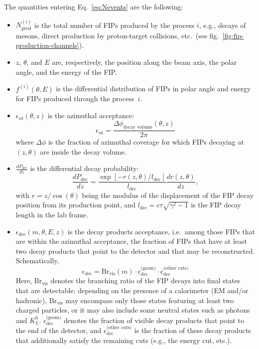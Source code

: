 \documentclass[
    aps,prd,
    twocolumn,
    nofootinbib,
    superscriptaddress,
]{revtex4}
\begin{document}
The quantities entering Eq.~\eqref{eq:Nevents} are the following:
\begin{itemize}
\item[--] $N_{\text{prod}}^{(i)}$ is the total number of FIPs produced by the process $i$, e.g., decays of mesons, direct production by proton-target collisions, etc.\ (see fig.~\ref{fig:fip-production-channels}).
\item[--] $z$, $\theta$, and $E$ are, respectively, the position along the beam axis, the polar angle, and the energy of the FIP.
\item[--] $f^{(i)}(\theta,E)$ is the differential distribution of FIPs in polar angle and energy for FIPs produced through the process~$i$.
\item[--]$\epsilon_{\text{az}}(\theta,z)$ is the azimuthal acceptance: 
    \begin{equation}
    \epsilon_{\text{az}} = \frac{\Delta \phi_{\text{decay volume}}(\theta,z)}{2\pi}
    \end{equation}
where $\Delta\phi$ is the fraction of azimuthal coverage for which FIPs decaying at $(z,\theta)$ are inside the decay volume.
\item[--] $\frac{dP_{\text{dec}}}{dz}$ is the differential decay probability: 
\begin{equation}
\frac{dP_{\text{dec}}}{dz} = \frac{\exp[-r(z,\theta)/l_{\text{dec}}]}{l_{\text{dec}}} \frac{dr(z,\theta)}{dz},
\end{equation}
with $r = z/\cos(\theta)$ being the modulus of the displacement of the FIP decay position from its production point, and $l_{\text{dec}}=c\tau \sqrt{\gamma^2-1}$ is the FIP decay length in the lab frame.
\item[--] $\epsilon_{\text{dec}}(m,\theta,E,z)$ is the decay products acceptance, i.e.\ among those FIPs that are within the azimuthal acceptance, the fraction of FIPs that have at least two decay products that point to the detector and that may be reconstructed. Schematically,
\begin{equation}
    \epsilon_{\text{dec}} = \text{Br}_{\text{vis}}(m)\cdot \epsilon_{\text{dec}}^{\text{(geom)}}\cdot \epsilon_{\text{dec}}^{\text{(other cuts)}}
    \label{eq:decay-acceptance-schematic}
\end{equation}
Here, $\text{Br}_{\text{vis}}$ denotes the branching ratio of the FIP decays into final states that are detectable; depending on the presence of a calorimeter (EM and/or hadronic), $\text{Br}_{\text{vis}}$ may encompass only those states featuring at least two charged particles, or it may also include some neutral states such as photons and $K^{0}_{L}$. $\epsilon_{\text{dec}}^{\text{(geom)}}$ denotes the fraction of visible decay products that point to the end of the detector, and $\epsilon_{\text{dec}}^{\text{(other cuts)}}$ is the fraction of these decay products that additionally satisfy the remaining cuts (e.g., the energy cut, etc.).

\end{itemize}
\end{document}
